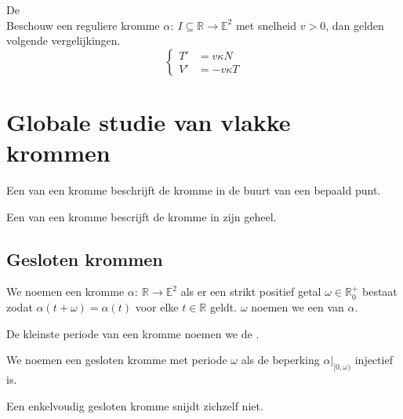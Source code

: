 \documentclass[main.tex]{subfiles}
\begin{document}
\begin{st}
  De \\
  Beschouw een reguliere kromme $\alpha:\ I \subseteq \mathbb{R} \rightarrow \mathbb{E}^{2}$ met snelheid $v>0$, dan gelden volgende vergelijkingen.
  \[
  \left\{
    \begin{array}{cl}
      T' &= v\kappa N\\
      V' &= -v\kappa T
    \end{array}
  \right.
  \]
\end{st}

\section{Globale studie van vlakke krommen}
\label{sec:globale-studie-van}

\begin{de}
  Een  van een kromme beschrijft de kromme in de buurt van een bepaald punt.
\end{de}

\begin{de}
  Een  van een kromme bescrijft de kromme in zijn geheel.
\end{de}

\subsection{Gesloten krommen}
\label{sec:gesloten-krommen}

\begin{de}
  We noemen een kromme $\alpha:\ \mathbb{R} \rightarrow \mathbb{E}^{2}$  als er een strikt positief getal $\omega\in \mathbb{R}^{+}_{0}$ bestaat zodat $\alpha(t + \omega) = \alpha(t)$ voor elke $t\in \mathbb{R}$ geldt.
  $\omega$ noemen we een  van $\alpha$.
\end{de}

\begin{de}
  De kleinste periode van een kromme noemen we de .
\end{de}

\begin{de}
  We noemen een gesloten kromme met periode $\omega$  als de beperking $\alpha|_{[0,\omega)}$ injectief is. 
\end{de}

\begin{ei}
  Een enkelvoudig gesloten kromme snijdt zichzelf niet.
\end{ei}
\end{document}
